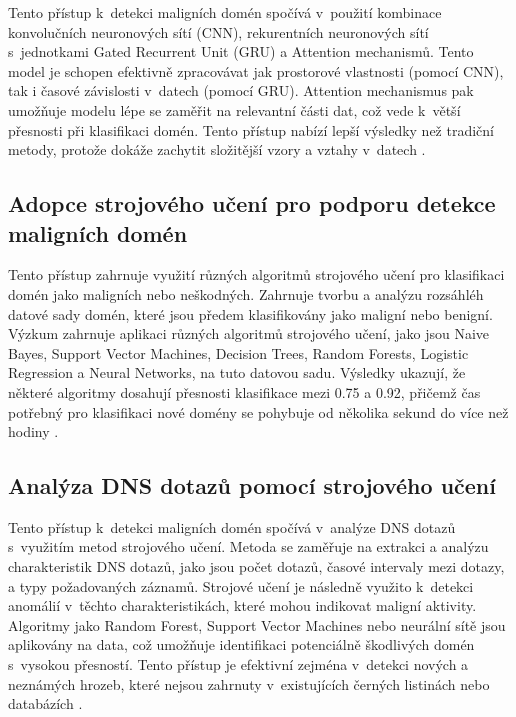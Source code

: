 Tento přístup k~detekci maligních domén spočívá v~použití kombinace konvolučních neuronových sítí (CNN), rekurentních neuronových sítí s~jednotkami Gated Recurrent Unit (GRU) a Attention mechanismů. Tento model je schopen efektivně zpracovávat jak prostorové vlastnosti (pomocí CNN), tak i časové závislosti v~datech (pomocí GRU). Attention mechanismus pak umožňuje modelu lépe se zaměřit na relevantní části dat, což vede k~větší přesnosti při klasifikaci domén. Tento přístup nabízí lepší výsledky než tradiční metody, protože dokáže zachytit složitější vzory a vztahy v~datech \cite{cnn_gru_attention}.

\subsection{Adopce strojového učení pro podporu detekce maligních domén}

Tento přístup zahrnuje využití různých algoritmů strojového učení pro klasifikaci domén jako maligních nebo neškodných. Zahrnuje tvorbu a analýzu rozsáhléh datové sady domén, které jsou předem klasifikovány jako maligní nebo benigní. Výzkum zahrnuje aplikaci různých algoritmů strojového učení, jako jsou Naive Bayes, Support Vector Machines, Decision Trees, Random Forests, Logistic Regression a Neural Networks, na tuto datovou sadu. Výsledky ukazují, že některé algoritmy dosahují přesnosti klasifikace mezi 0.75  a 0.92, přičemž čas potřebný pro klasifikaci nové domény se pohybuje od několika sekund do více než hodiny \cite{ml_malicious_domains}.


\subsection{Analýza DNS dotazů pomocí strojového učení}

Tento přístup k~detekci maligních domén spočívá v~analýze DNS dotazů s~využitím metod strojového učení. Metoda se zaměřuje na extrakci a analýzu charakteristik DNS dotazů, jako jsou počet dotazů, časové intervaly mezi dotazy, a typy požadovaných záznamů. Strojové učení je následně využito k~detekci anomálií v~těchto charakteristikách, které mohou indikovat maligní aktivity. Algoritmy jako Random Forest, Support Vector Machines nebo neurální sítě jsou aplikovány na data, což umožňuje identifikaci potenciálně škodlivých domén s~vysokou přesností. Tento přístup je efektivní zejména v~detekci nových a neznámých hrozeb, které nejsou zahrnuty v~existujících černých listinách nebo databázích \cite{dns_query_analysis_ml}.

